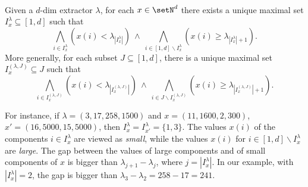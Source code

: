 \begin{prop}\label{prop:Ilambdax}
\hfill\\	
Given a $d$-dim extractor $\lambda$,
for each $x\in\setN^{d}$ there exists a unique maximal
	set $I_x^\lambda\subseteq [1,d]$ such that 
	\[\bigwedge_{i\in
	I^\lambda_x}\left(x(i)<\lambda_{|I^\lambda_x|}\right)\ \land\ 
	\bigwedge_{i\in[1,d]\smallsetminus
	I^\lambda_x}\left(x(i)\geq\lambda_{|I^\lambda_x|+1}\right).
	\]
	More generally, for each subset $J\subseteq [1,d]$, there is 	a unique maximal
	set $I_x^{(\lambda,J)}\subseteq J$ such that 
	\[\bigwedge_{i\in
	I^{(\lambda,J)}_x}\left(x(i)<\lambda_{|I^{(\lambda,J)}_x|}\right)\
	\land \
	\bigwedge_{i\in J\smallsetminus
	I^{(\lambda,J)}_x}\left(x(i)\geq\lambda_{|I^{(\lambda,J)}_x|+1}\right).
	\]
\end{prop}	
\noindent
For instance, if $\lambda=(3,17,258,1500)$ and $x=(11,1600,2,300)$,
$x'=(16,5000,15,5000)$, then $I^\lambda_x=I^\lambda_{x'}=\{1,3\}$.
The values $x(i)$ of the  components $i\in I^\lambda_x$ are viewed as
\emph{small}, while the values $x(i)$ for $i\in [1,d]\smallsetminus I^\lambda_x$ are
\emph{large}. The gap between the values of large components and of
small components of $x$ is bigger
than $\lambda_{j+1}-\lambda_j$, where $j=|I^\lambda_x|$.
In our example, with $|I^\lambda_x|=2$, the gap is bigger than $\lambda_3-\lambda_2=258-17=241$.

